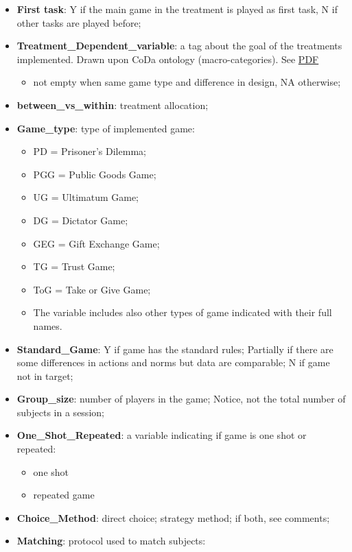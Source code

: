 \documentclass[
]{article}
\providecommand{\tightlist}{%
  \setlength{\itemsep}{0pt}\setlength{\parskip}{0pt}}
\begin{document}
\begin{itemize}
\tightlist
\item
  \textbf{First task}: Y if the main game in the treatment is played as
  first task, N if other tasks are played before;
\item
  \textbf{Treatment\_Dependent\_variable}: a tag about the goal of the
  treatments implemented. Drawn upon CoDa ontology (macro-categories).
  See
  \href{https://cooperationdatabank.org/wp-content/uploads/2020/10/Complete-Codebook_12Oct.pdf}{PDF}

  \begin{itemize}
  \tightlist
  \item
    not empty when same game type and difference in design, NA
    otherwise;
  \end{itemize}
\item
  \textbf{between\_vs\_within}: treatment allocation;
\item
  \textbf{Game\_type}: type of implemented game:

  \begin{itemize}
  \tightlist
  \item
    PD = Prisoner's Dilemma;
  \item
    PGG = Public Goods Game;
  \item
    UG = Ultimatum Game;
  \item
    DG = Dictator Game;
  \item
    GEG = Gift Exchange Game;
  \item
    TG = Trust Game;
  \item
    ToG = Take or Give Game;
  \item
    The variable includes also other types of game indicated with their
    full names.
  \end{itemize}
\item
  \textbf{Standard\_Game}: Y if game has the standard rules; Partially
  if there are some differences in actions and norms but data are
  comparable; N if game not in target;
\item
  \textbf{Group\_size}: number of players in the game; Notice, not the
  total number of subjects in a session;
\item
  \textbf{One\_Shot\_Repeated}: a variable indicating if game is one
  shot or repeated:

  \begin{itemize}
  \tightlist
  \item
    one shot
  \item
    repeated game
  \end{itemize}
\item
  \textbf{Choice\_Method}: direct choice; strategy method; if both, see
  comments;
\item
  \textbf{Matching}: protocol used to match subjects:


\end{itemize}
\end{document}
